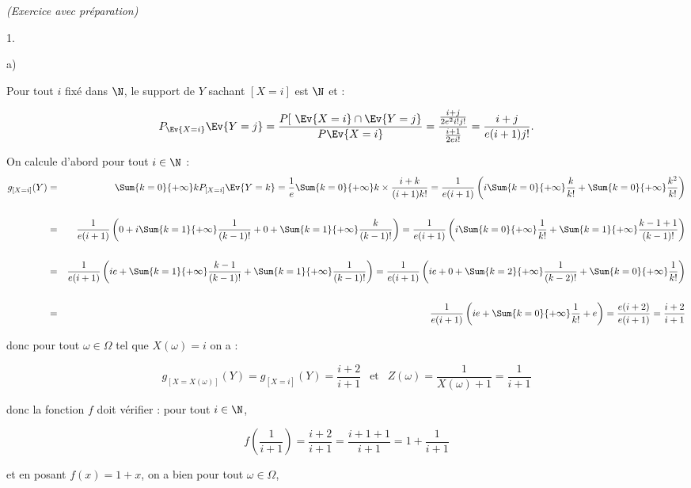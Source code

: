 \documentclass[11pt]{article}%
\begin{document}
\begin{exercice}{\it (Exercice avec préparation)}
\begin{noliste}{1.}
\begin{noliste}{a)}
 \item Pour tout $i$ fixé dans $\N$, le support de $Y$ sachant $[X =
i]$ est $\N$ et : 
 
\[
 P_{ \Ev{X = i} } \Ev{Y = j } = \frac{ P [ \ \Ev{X = i} \cap \Ev{Y = j}
}{ P \Ev{ X = i } } = \frac{ \frac{ i + j }{ 2 e^{2} i! j! } }{ \frac{
i + 1 }{ 2 e i! } } = \frac{ i + j }{ e (i + 1) j! }. 
\]

 \item On calcule d'abord pour tout $i \in \N$ : 
 \begin{eqnarray*}
 g_{ [X = i ] } (Y) & = & \Sum{k = 0}{+ \infty} k P_{ [X = i ] } \Ev{Y
= k } = \frac{ 1 }{ e } \Sum{k = 0}{+ \infty} k \times \frac{ i + k }{
(i + 1) k! } = \frac{ 1 }{ e (i + 1) } \left( i \Sum{k = 0}{+ \infty}
\frac{ k }{ k! } + \Sum{k = 0}{+ \infty} \frac{ k^{2} }{ k! } \right)
\\
\\
 & = & \frac{ 1 }{ e (i + 1) } \left( 0 + i \Sum{k = 1}{+ \infty}
\frac{ 1 }{ (k-1)! } + 0 + \Sum{k = 1}{+ \infty} \frac{ k }{ (k-1)! }
\right) = \frac{ 1 }{ e (i + 1) } \left( i \Sum{k = 0}{+ \infty} \frac{
1 }{ k! } + \Sum{k = 1}{+ \infty} \frac{ k-1 + 1 }{ (k-1)! } \right) \\
\\
 & = & \frac{ 1 }{ e (i + 1) } \left( i e + \Sum{k = 1}{+ \infty}
\frac{ k-1 }{ (k-1)! } + \Sum{k = 1}{+ \infty} \frac{ 1 }{ (k-1)! }
\right) = \frac{ 1 }{ e (i + 1) } \left( i e + 0 + \Sum{k = 2}{+
\infty} \frac{ 1 }{ (k-2)! } + \Sum{k = 0}{+ \infty} \frac{ 1 }{ k! }
\right) \\
\\
 & = & \frac{ 1 }{ e (i + 1) } \left( i e + \Sum{k = 0}{+ \infty}
\frac{ 1 }{ k! } + e \right) = \frac{ e ( i + 2 ) }{ e (i + 1 ) } =
\frac{ i + 2 }{ i + 1 } 
 \end{eqnarray*}

 donc pour tout $\omega \in \Omega$ tel que $ X (\omega ) = i$ on a : 
 
\[
 g_{ [ X = X ( \omega) ] } (Y ) = g_{ [ X = i ] } (Y ) = \frac{ i + 2
}{ i + 1 } \ \ \text{ et } \ \ Z ( \omega ) = \frac{ 1 }{ X ( \omega )
+ 1 } = \frac{ 1 }{ i + 1 } 
\]

 donc la fonction $f$ doit vérifier : pour tout $i \in \N$,
 
\[
 f \left( \frac{ 1 }{ i + 1 } \right) = \frac{ i + 2 }{ i + 1 } =
\frac{ i + 1 + 1 }{ i + 1 } = 1 + \frac{ 1 }{ i + 1 } 
\]

 et en posant $f(x) = 1 + x$, on a bien pour tout $\omega \in \Omega$,
 

\end{noliste}
\end{noliste}
\end{exercice}
\end{document}
